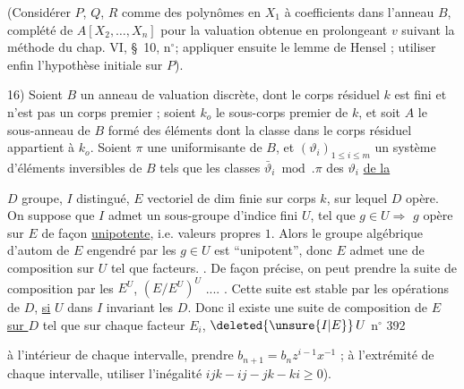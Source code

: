 (Considérer $P$, $Q$, $R$ comme des polynômes en $X_1$ à coefficients dans l'anneau $B$, complété de $A[X_2,\ldots,X_n]$ pour la valuation obtenue en prolongeant $v$ suivant la méthode du chap. VI, \S~10, n$^{\circ}$\qquad ; appliquer ensuite le lemme de Hensel ; utiliser enfin l'hypothèse initiale sur $P$).

16) Soient $B$ un anneau de valuation discrète, dont le corps résiduel $k$ est fini et n'est pas un corps premier ; soient $k_o$ le sous-corps premier de $k$, et soit $A$ le sous-anneau de $B$ formé des éléments dont la classe dans le corps résiduel appartient à $k_o$. Soient $\pi$ une uniformisante de $B$, et $(\vartheta_i)_{1\leq i\leq m}$ un système d'éléments inversibles de $B$ tels que les classes $\bar\vartheta_i\bmod.\pi$ des $\vartheta_i$
\uline{ de la }

$D$ groupe, $I$  distingué, $E$ vectoriel de dim finie sur corps $k$, sur lequel $D$ opère. On suppose que $I$ admet un sous-groupe d'indice fini $U$,  tel que $g\in U\Rightarrow$ $g$ opère sur $E$ de façon \uline{unipotente}, i.e. valeurs propres  $1$. Alors le groupe algébrique d'autom de $E$ engendré par les $g\in U$ est ``unipotent'', donc  $E$ admet une  de composition sur $U$ tel que   facteurs. . De façon précise, on peut prendre la suite de composition par les $E^U$, $(E/E^U)^U$ .... . Cette suite est stable par les opérations de $D$, \uline{si}    $U$ dans $I$ invariant  les $D$. Donc il existe une suite de composition de $E$ \uline{sur $D$} tel que sur chaque facteur $E_i$, $\deleted{\unsure{I|E}}\,U$
\hfill n$^{\circ}$ 392

à l'intérieur de chaque intervalle, prendre $b_{n+1}=b_nz^{i-1}x^{-1}$ ; à l'extrémité de chaque intervalle, utiliser l'inégalité $ijk-ij-jk-ki\geq 0$).

